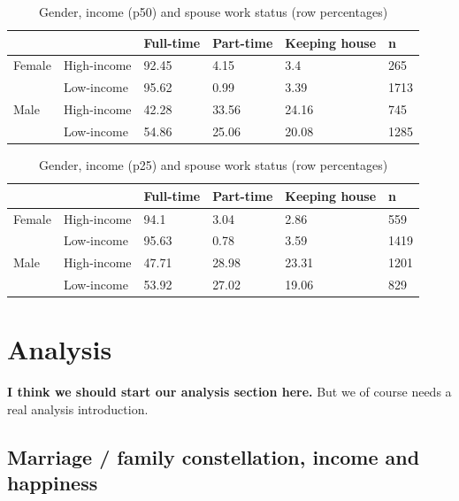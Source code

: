 \documentclass[]{article}
\begin{document}
\begin{table}[]
\centering
\caption{Gender, income (p50) and spouse work status (row percentages)}
\label{my-label}
\begin{tabular}{llllll}
\hline
       &             & Full-time & Part-time & Keeping house & n    \\ \hline
Female & High-income & 92.45     & 4.15      & 3.4           & 265  \\
       & Low-income  & 95.62     & 0.99      & 3.39          & 1713 \\
Male   & High-income & 42.28     & 33.56     & 24.16         & 745  \\
       & Low-income  & 54.86     & 25.06     & 20.08         & 1285 \\ \hline
\end{tabular}
\end{table}

\begin{table}[]
\centering
\caption{Gender, income (p25) and spouse work status (row percentages)}
\label{my-label}
\begin{tabular}{llllll}
\hline
       &             & Full-time & Part-time & Keeping house & n    \\ \hline
Female & High-income & 94.1      & 3.04      & 2.86          & 559  \\
       & Low-income  & 95.63     & 0.78      & 3.59          & 1419 \\
Male   & High-income & 47.71     & 28.98     & 23.31         & 1201 \\
       & Low-income  & 53.92     & 27.02     & 19.06         & 829  \\ \hline
\end{tabular}
\end{table}

\section{Analysis}\label{analysis}

\textbf{I think we should start our analysis section here.} But we of
course needs a real analysis introduction.

\subsection{Marriage / family constellation, income and
happiness}\label{marriage-family-constellation-income-and-happiness}
\end{document}
